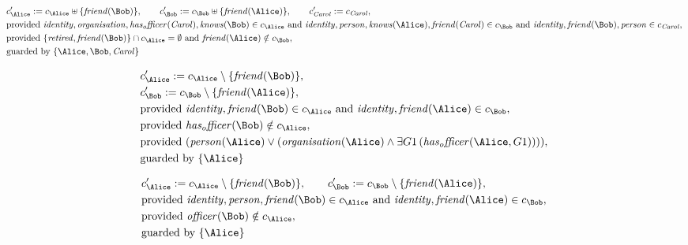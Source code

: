 \begin{align*}
&
c'_
{
\Alice
}
 := 
c_
{
\Alice
}
 \uplus 
\{
\mathit{
friend
}
(
\Bob
)
\}
, \qquad 
c'_
{
\Bob
}
 := 
c_
{
\Bob
}
 \uplus 
\{
\mathit{
friend
}
(
\Alice
)
\}
, \qquad 
c'_
{
\mathit{Carol}
}
 := 
c_
{
\mathit{Carol}
}
,\\
&
\text{provided } 
\mathit{
identity
}
,
\mathit{
organisation
}
,
\mathit{
has_officer
}
(
\mathit{Carol}
)
,
\mathit{
knows
}
(
\Bob
)
 \in c_
{
\Alice
}
 \text{ and } 
\mathit{
identity
}
,
\mathit{
person
}
,
\mathit{
knows
}
(
\Alice
)
,
\mathit{
friend
}
(
\mathit{Carol}
)
 \in c_
{
\Bob
}
 \text{ and } 
\mathit{
identity
}
,
\mathit{
friend
}
(
\Bob
)
,
\mathit{
person
}
 \in c_
{
\mathit{Carol}
}
,\\
&
\text{provided } 
\{
\mathit{
retired
}
,
\mathit{
friend
}
(
\Bob
)
\}
 \cap c_
{
\Alice
}
 = \emptyset
 \text{ and } 
\mathit{
friend
}
(
\Alice
)
 \notin c_
{
\Bob
}
,\\
&
\text{guarded by } \{
\Alice
,
\Bob
,
\mathit{Carol}
\}
\end{align*}

\begin{align*}
&
c'_
{
\Alice
}
 := 
c_
{
\Alice
}
 \setminus 
\{
\mathit{
friend
}
(
\Bob
)
\}
,\\
&
c'_
{
\Bob
}
 := 
c_
{
\Bob
}
 \setminus 
\{
\mathit{
friend
}
(
\Alice
)
\}
,\\
&
\text{provided } 
\mathit{
identity
}
,
\mathit{
friend
}
(
\Bob
)
 \in c_
{
\Alice
}
 \text{ and } 
\mathit{
identity
}
,
\mathit{
friend
}
(
\Alice
)
 \in c_
{
\Bob
}
,\\
&
\text{provided } 
\mathit{
has_officer
}
(
\Bob
)
 \notin c_
{
\Alice
}
,\\
&
\text{provided } 
(
\mathit{
person
}
(
\Alice
)
\lor
(
\mathit{
organisation
}
(
\Alice
)
\land
\exists 
G1
\,(
\mathit{
has_officer
}
(
\Alice
,
G1
)
)
)
)
,\\
&
\text{guarded by } \{
\Alice
\}
\end{align*}

\begin{align*}
&
c'_
{
\Alice
}
 := 
c_
{
\Alice
}
 \setminus 
\{
\mathit{
friend
}
(
\Bob
)
\}
, \qquad 
c'_
{
\Bob
}
 := 
c_
{
\Bob
}
 \setminus 
\{
\mathit{
friend
}
(
\Alice
)
\}
,\\
&
\text{provided } 
\mathit{
identity
}
,
\mathit{
person
}
,
\mathit{
friend
}
(
\Bob
)
 \in c_
{
\Alice
}
 \text{ and } 
\mathit{
identity
}
,
\mathit{
friend
}
(
\Alice
)
 \in c_
{
\Bob
}
,\\
&
\text{provided } 
\mathit{
officer
}
(
\Bob
)
 \notin c_
{
\Alice
}
,\\
&
\text{guarded by } \{
\Alice
\}
\end{align*}
